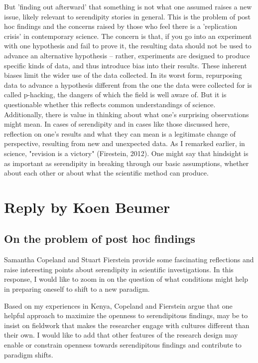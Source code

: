 \documentclass[authordate, empirical]{jote-new-article}
\begin{document}
	But 'finding out afterward' that something is not what one assumed raises a new issue, likely relevant to serendipity stories in general. This is the problem of post hoc findings and the concerns raised by those who feel there is a 'replication crisis' in contemporary science. The concern is that, if you go into an experiment with one hypothesis and fail to prove it, the resulting data should not be used to advance an alternative hypothesis -- rather, experiments are designed to produce specific kinds of data, and thus introduce bias into their results. These inherent biases limit the wider use of the data collected. In its worst form, repurposing data to advance a hypothesis different from the one the data were collected for is called p-hacking, the dangers of which the field is well aware of. But it is questionable whether this reflects common understandings of science. Additionally, there is value in thinking about what one's surprising observations might mean. In cases of serendipity and in cases like those discussed here, reflection on one's results and what they can mean is a legitimate change of perspective, resulting from new and unexpected data. As I remarked earlier, in science, "revision is a victory" (Firestein, 2012). One might say that hindsight is as important as serendipity in breaking through our basic assumptions, whether about each other or about what the scientific method can produce.



	\section{Reply by Koen Beumer}



	\subsection{On the problem of post hoc findings}



	Samantha Copeland and Stuart Fierstein provide some fascinating reflections and raise interesting points about serendipity in scientific investigations. In this response, I would like to zoom in on the question of what conditions might help in preparing oneself to shift to a new paradigm.



	Based on my experiences in Kenya, Copeland and Fierstein argue that one helpful approach to maximize the openness to serendipitous findings, may be to insist on fieldwork that makes the researcher engage with cultures different than their own. I would like to add that other features of the research design may enable or constrain openness towards serendipitous findings and contribute to paradigm shifts.
\end{document}
